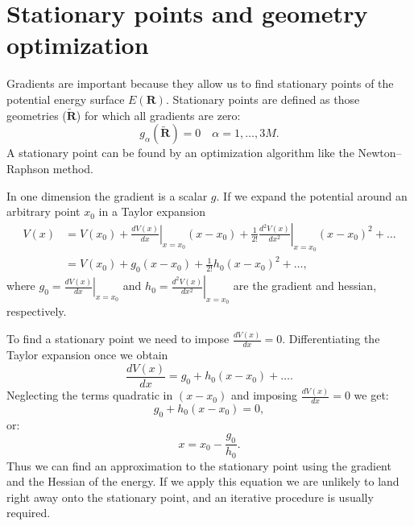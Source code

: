 \documentclass[../Main/chem532-notes.tex]{subfiles}
\begin{document}
\section{Stationary points and geometry optimization}
Gradients are important because they allow us to find stationary points of the potential energy surface $E(\mathbf{R})$.
Stationary points are defined as those geometries ($\tilde{\mathbf{R}}$) for which all gradients are zero:
\begin{equation}
g_\alpha(\tilde{\mathbf{R}}) = 0 \quad \alpha = 1,\ldots,3M.
\end{equation}
A stationary point can be found by an optimization algorithm like the Newton--Raphson method. 

\begin{example}
In one dimension the gradient is a scalar $g$.
If we expand the potential around an arbitrary point $x_0$ in a Taylor expansion
\begin{equation}
\begin{split}
V(x) &= V(x_0) + \left.\frac{dV(x)}{dx}\right|_{x = x_0} (x - x_0)
+ \frac{1}{2!} \left.\frac{d^2V(x)}{dx^2}\right|_{x = x_0} (x - x_0)^2 + \ldots \\
&= V(x_0) + g_0 (x - x_0)
+ \frac{1}{2!} h_0 (x - x_0)^2 + \ldots,
\end{split}
\end{equation}
where $g_0 = \left.\frac{dV(x)}{dx}\right|_{x = x_0}$ and $h_0 = \left.\frac{d^2V(x)}{dx^2}\right|_{x = x_0}$ are the gradient and hessian, respectively.

To find a stationary point we need to impose $\frac{dV(x)}{dx} = 0$. Differentiating the Taylor expansion once we obtain
\begin{equation}
\frac{dV(x)}{dx} = g_0 + h_0 (x - x_0) + \ldots.
\end{equation}
Neglecting the terms quadratic in $(x - x_0)$ and imposing $\frac{dV(x)}{dx} = 0$ we get:
\begin{equation}
g_0 + h_0 (x - x_0) = 0,
\end{equation}
or:
\begin{equation}
x = x_0 - \frac{g_0}{h_0}.
\end{equation}
Thus we can find an approximation to the stationary point using the gradient and the Hessian of the energy.
If we apply this equation we are unlikely to land right away onto the stationary point, and an iterative procedure is usually required.
\end{example}
\end{document}
